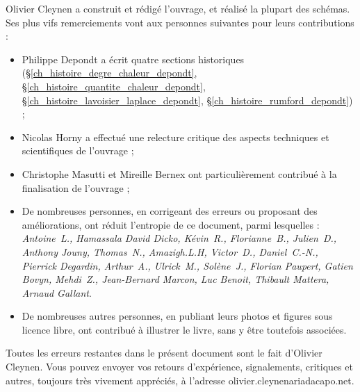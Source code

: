 Olivier Cleynen a construit et rédigé l’ouvrage, et réalisé la plupart des schémas. Ses plus vifs remerciements vont aux personnes suivantes pour leurs contributions :
\begin{itemize}
	\item Philippe Depondt a écrit quatre sections historiques (\S\ref{ch_histoire_degre_chaleur_depondt}, \S\ref{ch_histoire_quantite_chaleur_depondt}, \S\ref{ch_histoire_lavoisier_laplace_depondt}, \S\ref{ch_histoire_rumford_depondt}) ;
	\item Nicolas Horny a effectué une relecture critique des aspects techniques et scientifiques de l’ouvrage ;
	\item Christophe Masutti et Mireille Bernex ont particulièrement contribué à la finalisation de l’ouvrage ;
	\item De nombreuses personnes, en corrigeant des erreurs ou proposant des améliorations, ont réduit l’entropie de ce document, parmi lesquelles : {\small\textit{Antoine\ L., Hamassala David Dicko, Kévin\ R., Florianne\ B., Julien\ D., Anthony Jouny, Thomas\ N., Amazigh.L.H, Victor\ D., Daniel\ C.-N., Pierrick Degardin, Arthur\ A., Ulrick\ M., Solène\ J., Florian Paupert, Gatien Bovyn, Mehdi\ Z., Jean-Bernard Marcon, Luc Benoit, Thibault Mattera, Arnaud Gallant}}.
	\item De nombreuses autres personnes, en publiant leurs photos et figures sous licence libre, ont contribué à illustrer le livre, sans y être toutefois associées.
\end{itemize}

Toutes les erreurs restantes dans le présent document sont le fait d’Olivier \mbox{Cleynen}. Vous pouvez envoyer vos retours d’expérience, signalements, critiques et autres, toujours très vivement appréciés, à l’adresse olivier.cleynenariadacapo.net.

